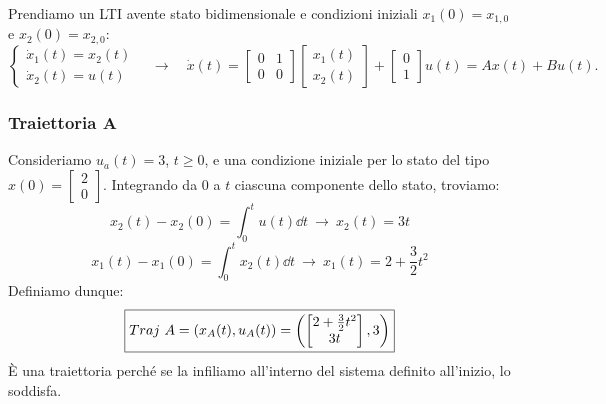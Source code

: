 \documentclass[a4paper]{report}
\begin{document}
\begin{esem} Prendiamo un LTI avente stato bidimensionale e condizioni iniziali $x_1(0) = x_{1,0}$ e $x_2(0) = x_{2,0}$:
	\begin{equation*}
		\begin{cases}
			\dot x_1(t)=x_2(t) \\
			\dot x_2(t) = u(t)
		\end{cases} \quad \rightarrow \quad  \dot x(t) = \begin{bmatrix}
			0 & 1 \\ 0 & 0
		\end{bmatrix}\begin{bmatrix}
		x_1(t) \\ x_2(t) \end{bmatrix}+\begin{bmatrix}
			0 \\ 1
		\end{bmatrix} u(t) = Ax(t)+Bu(t).
	\end{equation*}
\subsubsection{Traiettoria A}
Consideriamo $u_a (t) = 3$, $t \geq 0$, e una condizione iniziale per lo stato del tipo $x(0) = \begin{bmatrix}
	2 \\ 0
\end{bmatrix}$. Integrando da $0 $ a $t$ ciascuna componente dello stato, troviamo:
\begin{equation*}
	x_2(t)- x_2(0) = \int_0^t u(t)\dd{t} \ \rightarrow \ x_2(t) = 3t
\end{equation*}
\begin{equation*}
	x_1(t) -x_1(0) = \int_0^t x_2(t)\dd{t} \ \rightarrow \ x_1(t) = 2+\frac{3}{2}t^2
\end{equation*}
Definiamo dunque:
\begin{equation*}
\boxed{
	Traj \ A =(x_A(t), u_A(t)) = \left( \begin{bmatrix}
		2+\frac{3}{2}t^2 \\ 3t
	\end{bmatrix}, 3 \right)}
\end{equation*}
È una traiettoria perché se la infiliamo all'interno del sistema definito all'inizio, lo soddisfa.


\end{esem}
\end{document}
